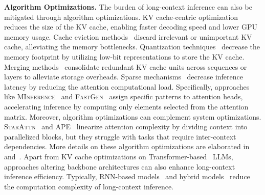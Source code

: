 \textbf{Algorithm Optimizations.}  
The burden of long-context inference can also be mitigated through algorithm optimizations. 
KV cache-centric optimization reduces the size of the KV cache, enabling faster decoding speed and lower GPU memory usage. 
Cache eviction methods~\cite{zhang2024h2o, li2024snapkv, yao2024sirllm, huang2024locret} discard irrelevant or unimportant KV cache, alleviating the memory bottlenecks. 
Quantization techniques~\cite{liu2024kivi, hooper2024kvquant, zhang2024kv,he2024zipcache} decrease the memory footprint by utilizing low-bit representations to store the KV cache. 
Merging methods~\cite{cai2024lococo, wang2024model, zhang2024simlayerkv, zhangcam} consolidate redundant KV cache units across sequences or layers to alleviate storage overheads. 
Sparse mechanisms~\cite{zaheer2020big, beltagy2020longformer, lou2024sparser} decrease inference latency by reducing the attention computational load. Specifically, approaches like \textsc{MInference}~\cite{jiang2024minference} and \textsc{FastGen}~\cite{ge2023model} assign specific patterns to attention heads, accelerating inference by computing only elements selected from the attention matrix. 
Moreover, algorithm optimizations can complement system optimizations.
\textsc{StarAttn}~\cite{acharya2024star} and \textsc{APE}~\cite{yang2025ape} linearize attention complexity by dividing context into parallelized blocks, but they struggle with tasks that require inter-context dependencies.
More details on these algorithm optimizations are elaborated in~\citet{li2024scbench} and~\citet{luohe2024keep}.
Apart from KV cache optimizations on Transformer-based~\cite{vaswani2017attention} LLMs, approaches altering backbone architectures can also enhance long-context inference efficiency.
Typically, RNN-based models~\citep{gu2023mamba,dao2024transformers} and hybrid models~\citep{lieber2024jamba,dong2024hymba,li2025minimax} reduce the computation complexity of long-context inference.